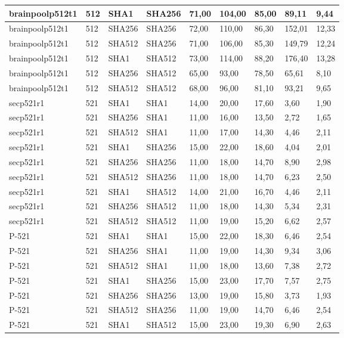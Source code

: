\begin{longtable}{| l | l | l | l | l |l |l |l |l |}
brainpoolp512t1 & 512 & SHA1 & SHA256 & 71,00 & 104,00 & 85,00 & 89,11 & 9,44 \\ \hline 
brainpoolp512t1 & 512 & SHA256 & SHA256 & 72,00 & 110,00 & 86,30 & 152,01 & 12,33 \\ \hline 
brainpoolp512t1 & 512 & SHA512 & SHA256 & 71,00 & 106,00 & 85,30 & 149,79 & 12,24 \\ \hline 
brainpoolp512t1 & 512 & SHA1 & SHA512 & 73,00 & 114,00 & 88,20 & 176,40 & 13,28 \\ \hline 
brainpoolp512t1 & 512 & SHA256 & SHA512 & 65,00 & 93,00 & 78,50 & 65,61 & 8,10 \\ \hline 
brainpoolp512t1 & 512 & SHA512 & SHA512 & 68,00 & 96,00 & 81,10 & 93,21 & 9,65 \\ \hline 
secp521r1 & 521 & SHA1 & SHA1 & 14,00 & 20,00 & 17,60 & 3,60 & 1,90 \\ \hline 
secp521r1 & 521 & SHA256 & SHA1 & 11,00 & 16,00 & 13,50 & 2,72 & 1,65 \\ \hline 
secp521r1 & 521 & SHA512 & SHA1 & 11,00 & 17,00 & 14,30 & 4,46 & 2,11 \\ \hline 
secp521r1 & 521 & SHA1 & SHA256 & 15,00 & 22,00 & 18,60 & 4,04 & 2,01 \\ \hline 
secp521r1 & 521 & SHA256 & SHA256 & 11,00 & 18,00 & 14,70 & 8,90 & 2,98 \\ \hline 
secp521r1 & 521 & SHA512 & SHA256 & 11,00 & 18,00 & 14,70 & 6,23 & 2,50 \\ \hline 
secp521r1 & 521 & SHA1 & SHA512 & 14,00 & 21,00 & 16,70 & 4,46 & 2,11 \\ \hline 
secp521r1 & 521 & SHA256 & SHA512 & 11,00 & 18,00 & 14,30 & 5,34 & 2,31 \\ \hline 
secp521r1 & 521 & SHA512 & SHA512 & 11,00 & 19,00 & 15,20 & 6,62 & 2,57 \\ \hline 
P-521 & 521 & SHA1 & SHA1 & 15,00 & 22,00 & 18,30 & 6,46 & 2,54 \\ \hline 
P-521 & 521 & SHA256 & SHA1 & 11,00 & 19,00 & 14,30 & 9,34 & 3,06 \\ \hline 
P-521 & 521 & SHA512 & SHA1 & 11,00 & 18,00 & 13,60 & 7,38 & 2,72 \\ \hline 
P-521 & 521 & SHA1 & SHA256 & 15,00 & 23,00 & 17,70 & 7,57 & 2,75 \\ \hline 
P-521 & 521 & SHA256 & SHA256 & 13,00 & 19,00 & 15,80 & 3,73 & 1,93 \\ \hline 
P-521 & 521 & SHA512 & SHA256 & 11,00 & 19,00 & 14,70 & 6,46 & 2,54 \\ \hline 
P-521 & 521 & SHA1 & SHA512 & 15,00 & 23,00 & 19,30 & 6,90 & 2,63 \\ \hline 

\end{longtable}
